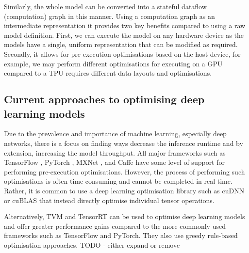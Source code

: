 Similarly, the whole model can be converted into a stateful dataflow (computation) graph in this manner. Using a computation graph as an intermediate representation it provides two key benefits compared to using a raw model definition. First, we can execute the model on any hardware device as the models have a single, uniform representation that can be modified as required. Secondly, it allows for pre-execution optimisations based on the host device, for example, we may perform different optimisations for executing on a GPU compared to a TPU requires different data layouts and optimisations.

\subsection{Current approaches to optimising deep learning models}
\label{sec:bg:subsec:currentapp}

Due to the prevalence and importance of machine learning, especially deep networks, there is a focus on finding ways decrease the inference runtime and by extension, increasing the model throughput. All major frameworks such as TensorFlow \cite{tensorflow2015-whitepaper}, PyTorch \cite{pytorch}, MXNet \cite{chen2015mxnet}, and Caffe \cite{jia2014caffe} have some level of support for performing pre-execution optimisations. However, the process of performing such optimisations is often time-consuming and cannot be completed in real-time. Rather, it is common to use a deep learning optimisation library such as cuDNN \cite{chetlur2014cudnn} or cuBLAS \cite{cublas2008} that instead directly optimise individual tensor operations.



Alternatively, TVM \cite{chen2018tvm} and TensorRT \cite{tensorrt2017} can be used to optimise deep learning models and offer greater performance gains compared to the more commonly used frameworks such as TensorFlow and PyTorch. They also use greedy rule-based optimisation approaches. TODO - either expand or remove

